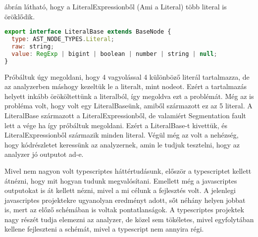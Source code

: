  ábrán látható, hogy a LiteralExpressionből (Ami a Literal) több literal is öröklődik.
\begin{lstlisting}[caption={Literal},label={lst:asg_file_literal}, language={JavaScript}]
export interface LiteralBase extends BaseNode {
  type: AST_NODE_TYPES.Literal;
  raw: string;
  value: RegExp | bigint | boolean | number | string | null;
}
\end{lstlisting}
Próbáltuk úgy megoldani, hogy 4 vagyolással 4 különböző literál tartalmazza, de az analyzerben máshogy kezeltük le a literalt, mint nodeot.
Ezért a tartalmazás helyett inkább örököltettünk a literalból, így megoldva ezt a problémát.
Még az is probléma volt, hogy volt egy LiteralBaseünk, amiből származott ez az 5 literal. A LiteralBase származott a LiteralExpressionből, de valamiért Segmentation fault lett a vége ha így próbáltuk megoldani.
Ezért a LiteralBase-t kivettük, és LiteralExpressionből származik minden literal.
Végül még az volt a nehézség, hogy kódrészletet keressünk az analyzernek, amin le tudjuk tesztelni, hogy az analyzer jó outputot ad-e.

\noindent

Mivel nem nagyon volt typescriptes háttértudásunk, először a typescriptet kellett átnézni, hogy mit hogyan tudunk megvalósítani.
Emellett még a javascriptes outputokat is át kellett nézni, mivel a mi célunk a fejlesztés volt. A jelenlegi javascriptes projektekre ugyanolyan eredményt adott, sőt néhány helyen jobbat is, mert az előző schémában is voltak pontatlanságok.
A typescriptes projektek nagy részét tudja elemezni az analyzer, de közel sem tökéletes, mivel egyfolytában kellene fejleszteni a schémát, mivel a typescript nem annyira régi.


